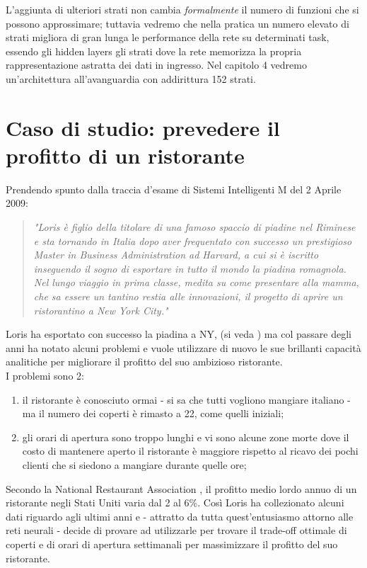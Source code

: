 L'aggiunta di ulteriori strati non cambia \emph{formalmente} il numero di funzioni che si possono approssimare; tuttavia vedremo che nella pratica un numero elevato di strati migliora di gran lunga le performance della rete su determinati task, essendo gli hidden layers gli strati dove la rete memorizza la propria rappresentazione astratta dei dati in ingresso. Nel capitolo 4 vedremo un'architettura all'avanguardia con addirittura 152 strati.
 

\section{Caso di studio: prevedere il profitto di un ristorante}
Prendendo spunto dalla traccia d'esame di Sistemi Intelligenti M del 2 Aprile 2009:
\begin{quote}
\textit{"Loris è figlio della titolare di una famoso spaccio di piadine nel Riminese e sta tornando in Italia
dopo aver frequentato con successo un prestigioso Master in Business Administration ad Harvard, a
cui si è iscritto inseguendo il sogno di esportare in tutto il mondo la piadina romagnola. Nel lungo
viaggio in prima classe, medita su come presentare alla mamma, che sa essere un tantino restia alle
innovazioni, il progetto di aprire un ristorantino a New York City."}
\end{quote}
Loris ha esportato con successo la piadina a NY, (si veda \parencite{WGradisca}) ma col passare degli anni ha notato alcuni problemi e vuole utilizzare di nuovo le sue brillanti capacità analitiche per migliorare il profitto del suo ambizioso ristorante. \\
I problemi sono 2: 
\begin{enumerate}
\item il ristorante è conosciuto ormai - si sa che tutti vogliono mangiare italiano - ma il numero dei coperti è rimasto a 22, come quelli iniziali; 
\item gli orari di apertura sono troppo lunghi e vi sono alcune zone morte dove il costo di mantenere aperto il ristorante è maggiore rispetto al ricavo dei pochi clienti che si siedono a mangiare durante quelle ore; 
\end{enumerate}
Secondo la National Restaurant Association \parencite{WProfit} \parencite{WRRG}, il profitto medio lordo annuo di un ristorante negli Stati Uniti varia dal 2 al 6\%. Così Loris ha collezionato alcuni dati riguardo agli ultimi anni e - attratto da tutta quest'entusiasmo attorno alle reti neurali - decide di provare ad utilizzarle per trovare il trade-off ottimale di coperti e di orari di apertura settimanali per massimizzare il profitto del suo ristorante. 
\\

